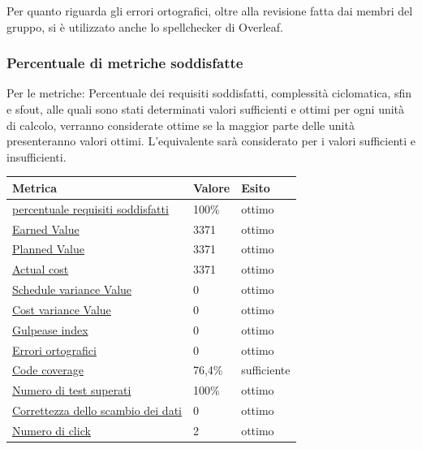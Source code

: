 Per quanto riguarda gli errori ortografici, oltre alla revisione fatta dai membri del gruppo, si è utilizzato anche lo spellchecker di Overleaf.

\newpage
\subsubsection{Percentuale di metriche soddisfatte}
    Per le metriche: Percentuale dei requisiti soddisfatti, complessità ciclomatica, sfin e sfout, alle quali sono stati determinati valori sufficienti e ottimi per ogni unità di calcolo,
    verranno considerate ottime se la maggior parte delle unità presenteranno valori ottimi. L'equivalente
    sarà considerato per i valori sufficienti e insufficienti. 


    \begin{longtabu} to \textwidth {| X[0.2,c m] | X[0.1,c m] | X[0.1,c m] |}
        \hline
        \textbf{Metrica} &
        \textbf{Valore} &
        \textbf{Esito}\\
        \hline
        \hyperlink{subsubsection.5.1.1}{percentuale requisiti soddisfatti}& 100\% & ottimo \\ 
        \hline
        \hyperlink{subsubsection.5.1.2}{Earned Value} & 3371 & ottimo  \\ 
        \hline
        \hyperlink{subsubsection.5.1.2}{Planned Value} & 3371 & ottimo  \\
        \hline
        \hyperlink{subsubsection.5.1.2}{Actual cost} & 3371 & ottimo  \\
        \hline
        \hyperlink{subsubsection.5.1.2}{Schedule variance Value} & 0 & ottimo  \\
        \hline
        \hyperlink{subsubsection.5.1.2}{Cost variance Value} & 0 & ottimo  \\
        \hline
        \hyperlink{subsubsection.5.2.1}{Gulpease index} & 0 & ottimo  \\
        \hline
        \hyperlink{subsubsection.5.2.2}{Errori ortografici} & 0 & ottimo  \\
        \hline
        \hyperlink{subsubsection.5.2.4}{Code coverage} & 76,4\% & sufficiente \\
        \hline
        \hyperlink{subsubsection.5.2.5}{Numero di test superati} & 100\% & ottimo \\
        \hline
        \hyperlink{subsubsection.5.3.1}{Correttezza dello scambio dei dati} & 0 & ottimo \\
        \hline
        \hyperlink{subsubsection.5.3.2}{Numero di click} & 2 & ottimo \\

\end{longtabu}
